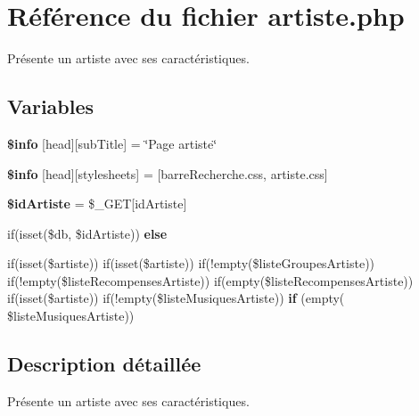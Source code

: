 \hypertarget{artiste_8php}{}\section{Référence du fichier artiste.\+php}
\label{artiste_8php}


Présente un artiste avec ses caractéristiques.  


\subsection*{Variables}
\begin{DoxyCompactItemize}
\item 
\mbox{\label{artiste_8php_a024f87f9bf4f3b33710e2e7ff8f60823}} 
{\bfseries \$info} \mbox{[}\textquotesingle{}head\textquotesingle{}\mbox{]}\mbox{[}\textquotesingle{}sub\+Title\textquotesingle{}\mbox{]} = \char`\"{}Page artiste\char`\"{}
\item 
\mbox{\label{artiste_8php_af6044c8bf78ebc8c58057e14d7738bbd}} 
{\bfseries \$info} \mbox{[}\textquotesingle{}head\textquotesingle{}\mbox{]}\mbox{[}\textquotesingle{}stylesheets\textquotesingle{}\mbox{]} = \mbox{[}\textquotesingle{}barre\+Recherche.\+css\textquotesingle{}, \textquotesingle{}artiste.\+css\textquotesingle{}\mbox{]}
\item 
\mbox{\label{artiste_8php_abe35e27f89d2c435a82aff453bdbcdaf}} 
{\bfseries \$id\+Artiste} = \$\+\_\+\+G\+ET\mbox{[}\textquotesingle{}id\+Artiste\textquotesingle{}\mbox{]}
\item 
if(isset(\$db, \$id\+Artiste)) {\bfseries else}
\item 
\mbox{\label{artiste_8php_ac454ad55ea95a2426c052c0a5ef7ccaf}} 
if(isset(\$artiste)) if(isset(\$artiste)) if(!empty(\$liste\+Groupes\+Artiste)) if(!empty(\$liste\+Recompenses\+Artiste)) if(empty(\$liste\+Recompenses\+Artiste)) if(isset(\$artiste)) if(!empty(\$liste\+Musiques\+Artiste)) {\bfseries if} (empty( \$liste\+Musiques\+Artiste))
\end{DoxyCompactItemize}


\subsection{Description détaillée}
Présente un artiste avec ses caractéristiques. 



